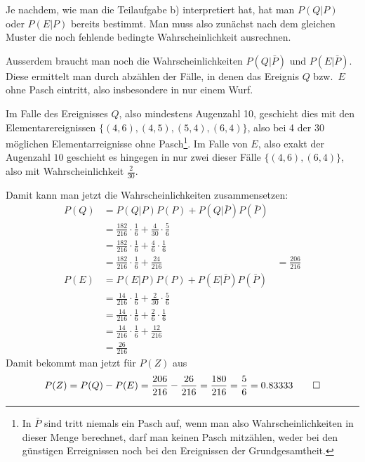 \begin{loesung}
\begin{teilaufgaben}
Je nachdem, wie man die Teilaufgabe b) interpretiert hat, hat man $P(Q|P)$
oder $P(E|P)$ bereits bestimmt. Man muss also zunächst nach dem gleichen
Muster die noch fehlende bedingte Wahrscheinlichkeit ausrechnen.

Ausserdem braucht man noch die Wahrscheinlichkeiten $P(Q|\bar P)$ und
$P(E|\bar P)$. Diese ermittelt man durch abzählen der Fälle, in denen
das Ereignis $Q$ bzw.~$E$ ohne Pasch eintritt, also insbesondere in nur
einem Wurf.

Im Falle des Ereignisses $Q$, also mindestens Augenzahl 10, geschieht dies
mit den Elementarereignissen $\{(4,6),(4,5),(5,4),(6,4)\}$, also bei 4 der 30
möglichen Elementarreignisse ohne Pasch\footnote{In $\bar P$ sind tritt
niemals ein Pasch auf, wenn man also Wahrscheinlichkeiten in dieser Menge
berechnet, darf man keinen Pasch mitzählen, weder bei den
günstigen Erreignissen noch bei den Ereignissen der Grundgesamtheit.}.
Im Falle von $E$, also exakt
der Augenzahl $10$ geschieht es hingegen in nur zwei dieser
Fälle $\{(4,6), (6,4)\}$, also mit Wahrscheinlichkeit $\frac{2}{30}$.

Damit kann man jetzt die Wahrscheinlichkeiten zusammensetzen:
\begin{align*}
P(Q)&=P(Q|P)P(P) + P(Q|\bar P)P(\bar P)\\
    &=\frac{182}{216}\cdot\frac16 + \frac4{30}\cdot\frac56\\
    &=\frac{182}{216}\cdot\frac16 + \frac4{6}\cdot\frac16\\
    &=\frac{182}{216}\cdot\frac16 + \frac{24}{216}
    &=\frac{206}{216}\\
P(E)&=P(E|P)P(P) + P(E|\bar P)P(\bar P)\\
    &=\frac{14}{216}\cdot\frac16 + \frac2{30}\cdot\frac56\\
    &=\frac{14}{216}\cdot\frac16 + \frac2{6}\cdot\frac16\\
    &=\frac{14}{216}\cdot\frac16 + \frac{12}{216}\\
    &=\frac{26}{216}
\end{align*}
Damit bekommt man jetzt für $P(Z)$ aus
\[
P(Z)=P(Q)-P(E)
=
    \frac{206}{216}
    -\frac{26}{216}
=\frac{180}{216}=\frac56=0.83333
\qedhere
\]
\end{teilaufgaben}
\end{loesung}


